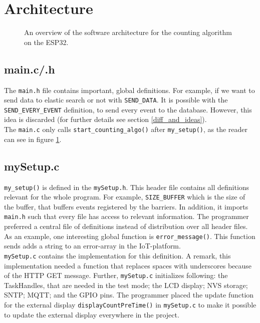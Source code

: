 \section{Architecture}


\begin{figure}%
    \centering
    \resizebox{0.8\textwidth}{!}{
        
    }
    \caption[Software overview]{An overview of the software architecture for the counting algorithm on the ESP32.}
    \label{fig_architectureOverview}
\end{figure}

\subsection{main.c/.h}
The \verb!main.h! file contains important, global definitions.
For example, if we want to send data to elastic search or not with \verb!SEND_DATA!. It is possible with
the \verb!SEND_EVERY_EVENT! definition, to send every event to the database. However, this idea is
discarded (for further details see section \ref{diff_and_ideas}).\\
The \verb!main.c! only calls \verb!start_counting_algo()! after \verb!my_setup()!, as the reader can see in
figure \ref{fig_architectureOverview}.

\subsection{mySetup.c}
\verb!my_setup()! is defined in the \verb!mySetup.h!. This header file contains all definitions relevant for the
whole program. For example, \verb!SIZE_BUFFER! which is the size of the buffer, that buffers
events registered by the barriers. In addition, it imports \verb!main.h! such that every file has access to relevant
information. The programmer preferred a central file of definitions instead of distribution over all header files.\\
As an example, one interesting global function is \verb!error_message()!.
This function sends adds a string to an error-array in the IoT-platform.\\
\verb!mySetup.c! contains the implementation for this definition. A remark,
this implementation needed a function that replaces spaces with underscores because of the HTTP GET message.
Further, \verb!mySetup.c!  initializes following:
the TaskHandles, that are needed in the test mode; the LCD display; NVS storage; SNTP; MQTT; and the GPIO pins.
The programmer placed the update function for the external display
\verb!displayCountPreTime()! in \verb!mySetup.c!
to make it possible to update the external display everywhere in the project.

